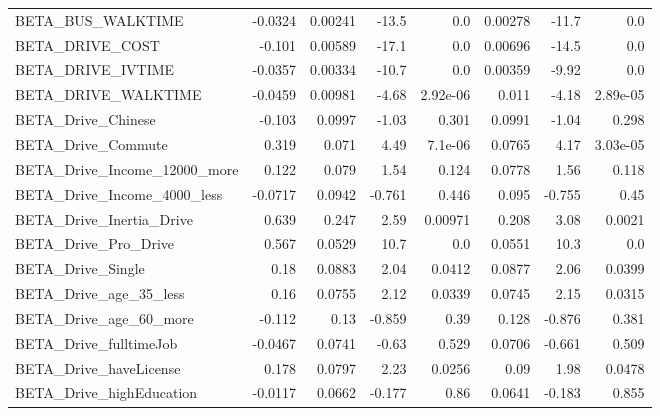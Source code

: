 \begin{tabular}{lrrrrrrr}
BETA\_BUS\_WALKTIME            &  -0.0324 &  0.00241 &    -13.5 &      0.0 &       0.00278 &        -11.7 &           0.0 \\
BETA\_DRIVE\_COST              &   -0.101 &  0.00589 &    -17.1 &      0.0 &       0.00696 &        -14.5 &           0.0 \\
BETA\_DRIVE\_IVTIME            &  -0.0357 &  0.00334 &    -10.7 &      0.0 &       0.00359 &        -9.92 &           0.0 \\
BETA\_DRIVE\_WALKTIME          &  -0.0459 &  0.00981 &    -4.68 & 2.92e-06 &         0.011 &        -4.18 &      2.89e-05 \\
BETA\_Drive\_Chinese           &   -0.103 &   0.0997 &    -1.03 &    0.301 &        0.0991 &        -1.04 &         0.298 \\
BETA\_Drive\_Commute           &    0.319 &    0.071 &     4.49 &  7.1e-06 &        0.0765 &         4.17 &      3.03e-05 \\
BETA\_Drive\_Income\_12000\_more &    0.122 &    0.079 &     1.54 &    0.124 &        0.0778 &         1.56 &         0.118 \\
BETA\_Drive\_Income\_4000\_less  &  -0.0717 &   0.0942 &   -0.761 &    0.446 &         0.095 &       -0.755 &          0.45 \\
BETA\_Drive\_Inertia\_Drive     &    0.639 &    0.247 &     2.59 &  0.00971 &         0.208 &         3.08 &        0.0021 \\
BETA\_Drive\_Pro\_Drive         &    0.567 &   0.0529 &     10.7 &      0.0 &        0.0551 &         10.3 &           0.0 \\
BETA\_Drive\_Single            &     0.18 &   0.0883 &     2.04 &   0.0412 &        0.0877 &         2.06 &        0.0399 \\
BETA\_Drive\_age\_35\_less       &     0.16 &   0.0755 &     2.12 &   0.0339 &        0.0745 &         2.15 &        0.0315 \\
BETA\_Drive\_age\_60\_more       &   -0.112 &     0.13 &   -0.859 &     0.39 &         0.128 &       -0.876 &         0.381 \\
BETA\_Drive\_fulltimeJob       &  -0.0467 &   0.0741 &    -0.63 &    0.529 &        0.0706 &       -0.661 &         0.509 \\
BETA\_Drive\_haveLicense       &    0.178 &   0.0797 &     2.23 &   0.0256 &          0.09 &         1.98 &        0.0478 \\
BETA\_Drive\_highEducation     &  -0.0117 &   0.0662 &   -0.177 &     0.86 &        0.0641 &       -0.183 &         0.855 \\

\end{tabular}
